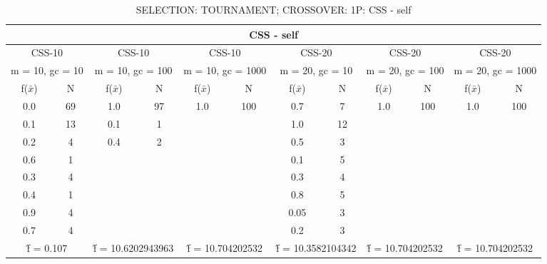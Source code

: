 \begin{table}[H]
	\centering
	\caption{SELECTION: TOURNAMENT; CROSSOVER: 1P: CSS - self}
	\begin{adjustbox}{width=1\textwidth}
		\begin{tabular}{ |c|c||c|c||c|c||c|c||c|c||c|c| }
			\hline
			\multicolumn{12}{|c|}{CSS - self} \\
			\hline
			\multicolumn{2}{|c||}{CSS-10} & \multicolumn{2}{c||}{CSS-10} & \multicolumn{2}{c||}{CSS-10} & \multicolumn{2}{c||}{CSS-20} & \multicolumn{2}{c||}{CSS-20} & \multicolumn{2}{c|}{CSS-20}\\
			\hline
			\multicolumn{2}{|c||}{m = 10, gc = 10} & \multicolumn{2}{c||}{m = 10, gc = 100} & \multicolumn{2}{c||}{m = 10, gc = 1000} & \multicolumn{2}{c||}{m = 20, gc = 10} & \multicolumn{2}{c||}{m = 20, gc = 100} & \multicolumn{2}{c|}{m = 20, gc = 1000}\\
			\hline
			f($\bar{x}$) & N & f($\bar{x}$) & N & f($\bar{x}$) & N & f($\bar{x}$) & N & f($\bar{x}$) & N & f($\bar{x}$) & N\\
			\hline
			\hline
			0.0 & 69 & 1.0 & 97 & 1.0 & 100 & 0.7 & 7 & 1.0 & 100 & 1.0 & 100\\
			0.1 & 13 & 0.1 & 1 &   &   & 1.0 & 12 &   &   &   &  \\
			0.2 & 4 & 0.4 & 2 &   &   & 0.5 & 3 &   &   &   &  \\
			0.6 & 1 &   &   &   &   & 0.1 & 5 &   &   &   &  \\
			0.3 & 4 &   &   &   &   & 0.3 & 4 &   &   &   &  \\
			0.4 & 1 &   &   &   &   & 0.8 & 5 &   &   &   &  \\
			0.9 & 4 &   &   &   &   & 0.05 & 3 &   &   &   &  \\
			0.7 & 4 &   &   &   &   & 0.2 & 3 &   &   &   &  \\
			\hline
			\multicolumn{2}{|c||}{\^{f} = 0.107} & \multicolumn{2}{c||}{\^{f} = 10.6202943963} & \multicolumn{2}{c||}{\^{f} = 10.704202532} & \multicolumn{2}{c||}{\^{f} = 10.3582104342} & \multicolumn{2}{c||}{\^{f} = 10.704202532} & \multicolumn{2}{c|}{\^{f} = 10.704202532}\\
			\hline
		\end{tabular}
	\end{adjustbox}
\end{table}
